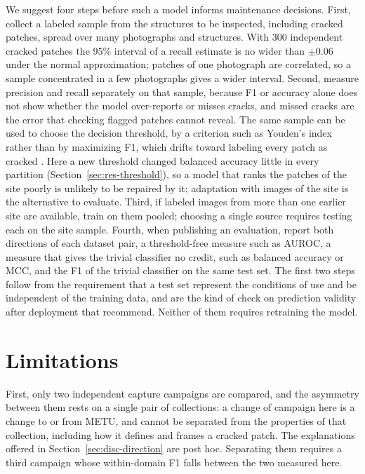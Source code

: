 \documentclass[pdflatex,sn-apa]{sn-jnl}
\begin{document}
We suggest four steps before such a model informs maintenance decisions. First, collect a labeled sample from the structures to be inspected, including cracked patches, spread over many photographs and structures. With 300 independent cracked patches the 95\% interval of a recall estimate is no wider than $\pm0.06$ under the normal approximation; patches of one photograph are correlated, so a sample concentrated in a few photographs gives a wider interval. Second, measure precision and recall separately on that sample, because F1 or accuracy alone does not show whether the model over-reports or misses cracks, and missed cracks are the error that checking flagged patches cannot reveal. The same sample can be used to choose the decision threshold, by a criterion such as Youden's index rather than by maximizing F1, which drifts toward labeling every patch as cracked \citep{lipton2014}. Here a new threshold changed balanced accuracy little in every partition (Section~\ref{sec:res-threshold}), so a model that ranks the patches of the site poorly is unlikely to be repaired by it; adaptation with images of the site \citep{santos2022, chun2024} is the alternative to evaluate. Third, if labeled images from more than one earlier site are available, train on them pooled; choosing a single source requires testing each on the site sample. Fourth, when publishing an evaluation, report both directions of each dataset pair, a threshold-free measure such as AUROC, a measure that gives the trivial classifier no credit, such as balanced accuracy or MCC, and the F1 of the trivial classifier on the same test set. The first two steps follow from the requirement that a test set represent the conditions of use and be independent of the training data, and are the kind of check on prediction validity after deployment that \citet{hasan2025} recommend. Neither of them requires retraining the model.

\section{Limitations}\label{sec:limitations}

First, only two independent capture campaigns are compared, and the asymmetry between them rests on a single pair of collections: a change of campaign here is a change to or from METU, and cannot be separated from the properties of that collection, including how it defines and frames a cracked patch. The explanations offered in Section~\ref{sec:disc-direction} are post hoc. Separating them requires a third campaign whose within-domain F1 falls between the two measured here.
\end{document}
